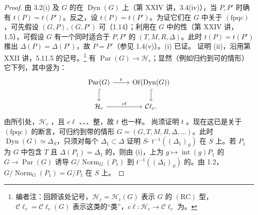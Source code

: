 \begin{proof}
由 3.2(i) 及 $G$ 的在 $\operatorname{Dyn}(G)$ 上（第 XXIV 讲，3.4(iv)），当 $P,P'$ 时确有 $t(P)=t(P')$。反之，设 $t(P)=t(P')$。为证它们在 $G$ 中关于 $(\mathrm{fpqc})$ ，可先假设 $(G,P),(G,P')$ 可（1.14）；利用在 $G$ 中的性（第 XXIV 讲，1.5），可假设 $G$ 有一个同时适合于 $P,P'$ 的 $(T,M,R,\Delta)$。此时 $t(P)=t(P')$ 推出 $\Delta(P)=\Delta(P')$，故 $P=P'$（参见 1.4(v)）。(i) 已证。
证明 (ii)，沿用第 XXII 讲，5.11.5 的记号。\footnote{编者注：回顾该处记号，$\mathcal H_c=\mathcal H_c(G)$ 表示 $G$ 的 $(\mathrm{RC})$ 型，$\mathcal C\ell_c=\mathcal C\ell_c(G)$ 表示这类的“类”，$c\ell:\mathcal H_c\to\mathcal C\ell_c$ 为。}
有 $\operatorname{Par}(G)\to\mathcal H_c$；显然（例如归约到可的情形）它下列，其中竖为：
\[\begin{tikzcd}
\operatorname{Par}(G)\arrow[r,"t"]\arrow[d,hook]&\operatorname{Of}(\operatorname{Dyn}(G))\arrow[d,hook]\\
\mathcal H_c\arrow[r,"c\ell"]&\mathcal C\ell_c.
\end{tikzcd}\]
由所引处，$\mathcal H_c$ ，且 $c\ell$ 、、、整，故 $t$ 也一样。
尚须证明 $t$ 。现在这已是关于 $(\mathrm{fpqc})$ 的断言，可归约到带的情形 $G=(G,T,M,R,\Delta,\ldots)$。此时 $\operatorname{Dyn}(G)\simeq\Delta_S$，只须对每个 $\Delta_1\subset\Delta$ 证明 $S$- $t^{-1}((\Delta_1)_S)$ 在 $S$ 上。若 $P_1$ 为 $G$ 中包含 $T$ 且 $\Delta(P_1)=\Delta_1$ 的，则由 (i)，上为 $g\mapsto\operatorname{int}(g)P_1$ 的 $G\to\operatorname{Par}(G)$
诱导 $G/\operatorname{Norm}_G(P_1)$ 到 $t^{-1}((\Delta_1)_S)$ 的。由 1.2，$G/\operatorname{Norm}_G(P_1)=G/P_1$ 在 $S$ 上。
\end{proof}
